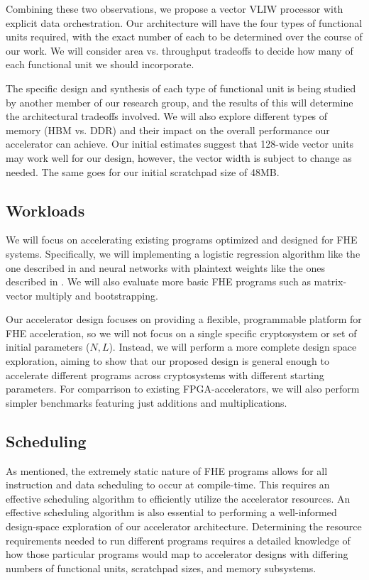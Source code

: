 Combining these two observations, we propose a vector VLIW processor with
explicit data orchestration. Our architecture will have the four types
of functional units required, with the exact number of each to be determined
over the course of our work. We will consider area vs. throughput tradeoffs
to decide how many of each functional unit we should incorporate.

The specific design and synthesis of each type of functional unit is being
studied by another member of our research group, and the results of this
will determine the architectural tradeoffs involved. 
We will also explore different types of memory (HBM vs. DDR) and their impact
on the overall performance our accelerator can achieve. 
Our initial estimates suggest that 128-wide vector units may work well for our
design, however, the vector width is subject to change as needed. The same goes
for our initial scratchpad size of 48MB.

\subsection{Workloads}

We will focus on accelerating existing programs optimized and designed for
FHE systems. Specifically, we will implementing a logistic regression
algorithm like the one described in \cite{han:iaai19:he-logreg} and neural
networks with plaintext weights like the ones described in 
\cite{dowlin:icml16:cryptonets}. We will also evaluate more basic FHE programs
such as matrix-vector multiply and bootstrapping.

Our accelerator design focuses on providing a flexible, programmable platform
for FHE acceleration, so we will not focus on a single specific cryptosystem
or set of initial parameters ($N, L$). Instead, we will perform a more complete
design space exploration, aiming to show that our proposed design is
general enough to accelerate different programs across
cryptosystems with different starting parameters.
For comparrison to existing FPGA-accelerators, we will also perform simpler
benchmarks featuring just additions and multiplications.

\subsection{Scheduling}

As mentioned, the extremely static nature of FHE programs allows for all
instruction and data scheduling to occur at compile-time. This requires
an effective scheduling algorithm to efficiently utilize the accelerator
resources. An effective scheduling algorithm is also essential to performing
a well-informed design-space exploration of our accelerator architecture.
Determining the resource requirements needed to run different programs requires
a detailed knowledge of how those particular programs would map to accelerator
designs with differing numbers of functional units, scratchpad sizes, and
memory subsystems.

